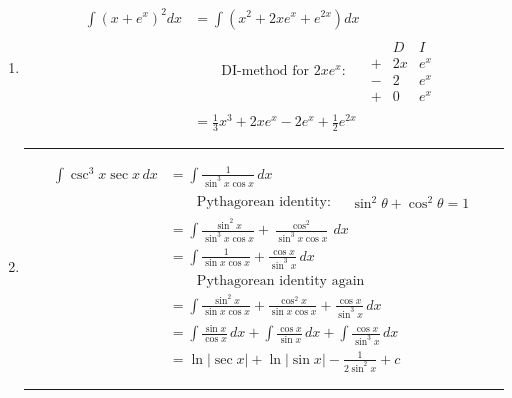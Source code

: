 \begin{enumerate}
  \item
    \begin{equation}
      \begin{aligned}
        \int (x+e^x)^2 dx
        & = \int (x^2 + 2xe^x+e^{2x}) dx \\
        & \qquad
          \text{DI-method for $2xe^x$:}
          \quad
          \boxed{
            \begin{aligned}
              \begin{array}{ccc}
                & D & I \\
               +& 2x & e^x \\
               -& 2 & e^x \\
               +& 0 & e^x
              \end{array}
            \end{aligned}
          } \\
        & = \frac{1}{3}x^3 + 2xe^x-2e^x+\frac{1}{2}e^{2x}
      \end{aligned}
    \end{equation}
    \bigbreak
    \hrule
    \bigbreak

  \item
    \begin{equation}
      \begin{aligned}
        \int \csc^3 x \sec x \, dx
        & = \int \frac{1}{\sin^3 x \cos x} \, dx \\
        & \qquad
          \text{Pythagorean identity:}
          \quad
          \boxed{
            \begin{aligned}
              \sin^2 \theta + \cos^2 \theta = 1
            \end{aligned}
          } \\
        & = \int \frac{\sin^2 x}{\sin^3 x \cos x} + \frac{\cos^2}{\sin^3 x \cos x} \, dx \\
        & = \int \frac{1}{\sin x \cos x} + \frac{\cos x}{\sin^3 x} \, dx \\
        &  \qquad \text{Pythagorean identity again} \\
        & = \int \frac{\sin^2 x}{\sin x \cos x}+ \frac{\cos^2 x}{\sin x \cos x} + \frac{\cos x}{\sin^3 x} \, dx \\
        & = \int \frac{\sin x}{\cos x} \, dx + \int \frac{\cos x}{\sin x} \, dx + \int \frac{\cos x}{\sin^3 x} \, dx \\
        & = \ln | \sec x | + \ln | \sin x | - \frac{1}{2 \sin^2 x} + c
      \end{aligned}
    \end{equation}
    \bigbreak
    \hrule
    \bigbreak


\end{enumerate}

